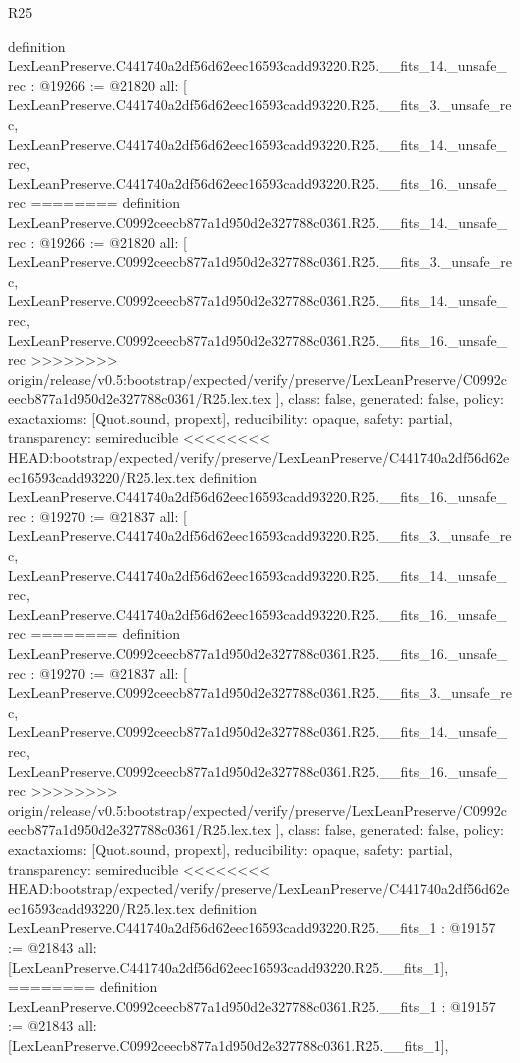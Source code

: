 \begin{lexlean}{R25}
\begin{coremodule}
{{{{{{{{{{{{{{{{{{{{{{{{{{{{{{{{{{{{{{{{{{{{{{{{{{{{{{{{{{{{{{{{{{{{{{{{{{{{{{{{{{{{{{{{{definition LexLeanPreserve.C441740a2df56d62eec16593cadd93220.R25.__fits_14._unsafe_rec : @19266 := @21820 {
  all: [
    LexLeanPreserve.C441740a2df56d62eec16593cadd93220.R25.__fits_3._unsafe_rec,
    LexLeanPreserve.C441740a2df56d62eec16593cadd93220.R25.__fits_14._unsafe_rec,
    LexLeanPreserve.C441740a2df56d62eec16593cadd93220.R25.__fits_16._unsafe_rec
========
definition LexLeanPreserve.C0992ceecb877a1d950d2e327788c0361.R25.__fits_14._unsafe_rec : @19266 := @21820 {
  all: [
    LexLeanPreserve.C0992ceecb877a1d950d2e327788c0361.R25.__fits_3._unsafe_rec,
    LexLeanPreserve.C0992ceecb877a1d950d2e327788c0361.R25.__fits_14._unsafe_rec,
    LexLeanPreserve.C0992ceecb877a1d950d2e327788c0361.R25.__fits_16._unsafe_rec
>>>>>>>> origin/release/v0.5:bootstrap/expected/verify/preserve/LexLeanPreserve/C0992ceecb877a1d950d2e327788c0361/R25.lex.tex
  ],
  class: false,
  generated: false,
  policy: exact{axioms: [Quot.sound, propext]},
  reducibility: opaque{},
  safety: partial,
  transparency: semireducible
}
<<<<<<<< HEAD:bootstrap/expected/verify/preserve/LexLeanPreserve/C441740a2df56d62eec16593cadd93220/R25.lex.tex
definition LexLeanPreserve.C441740a2df56d62eec16593cadd93220.R25.__fits_16._unsafe_rec : @19270 := @21837 {
  all: [
    LexLeanPreserve.C441740a2df56d62eec16593cadd93220.R25.__fits_3._unsafe_rec,
    LexLeanPreserve.C441740a2df56d62eec16593cadd93220.R25.__fits_14._unsafe_rec,
    LexLeanPreserve.C441740a2df56d62eec16593cadd93220.R25.__fits_16._unsafe_rec
========
definition LexLeanPreserve.C0992ceecb877a1d950d2e327788c0361.R25.__fits_16._unsafe_rec : @19270 := @21837 {
  all: [
    LexLeanPreserve.C0992ceecb877a1d950d2e327788c0361.R25.__fits_3._unsafe_rec,
    LexLeanPreserve.C0992ceecb877a1d950d2e327788c0361.R25.__fits_14._unsafe_rec,
    LexLeanPreserve.C0992ceecb877a1d950d2e327788c0361.R25.__fits_16._unsafe_rec
>>>>>>>> origin/release/v0.5:bootstrap/expected/verify/preserve/LexLeanPreserve/C0992ceecb877a1d950d2e327788c0361/R25.lex.tex
  ],
  class: false,
  generated: false,
  policy: exact{axioms: [Quot.sound, propext]},
  reducibility: opaque{},
  safety: partial,
  transparency: semireducible
}
<<<<<<<< HEAD:bootstrap/expected/verify/preserve/LexLeanPreserve/C441740a2df56d62eec16593cadd93220/R25.lex.tex
definition LexLeanPreserve.C441740a2df56d62eec16593cadd93220.R25.__fits_1 : @19157 := @21843 {
  all: [LexLeanPreserve.C441740a2df56d62eec16593cadd93220.R25.__fits_1],
========
definition LexLeanPreserve.C0992ceecb877a1d950d2e327788c0361.R25.__fits_1 : @19157 := @21843 {
  all: [LexLeanPreserve.C0992ceecb877a1d950d2e327788c0361.R25.__fits_1],
}}}}}}}}}}}}}}}}}}}}}}}}}}}}}}}}}}}}}}}}}}}}}}}}}}}}}}}}}}}}}}}}}}}}}}}}}}}}}}}}}}}}}}}}}}}}}
\end{coremodule}
\end{lexlean}
